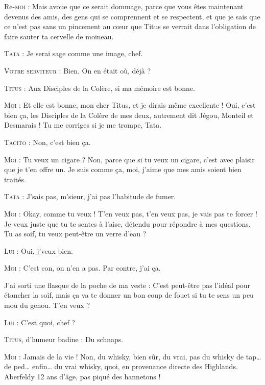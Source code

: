 \begin{dialogue}

Re-\textsc{moi} : Mais avoue que ce serait dommage, parce que vous êtes maintenant devenus des amis, des gens qui se comprennent et se respectent, et que je sais que ce n’est pas sans un pincement au cœur que Titus se verrait dans l’obligation de faire sauter ta cervelle de moineau.

\textsc{Tata} : Je serai sage comme une image, chef.

\textsc{Votre serviteur} : Bien. On en était où, déjà ?

\textsc{Titus} : Aux Disciples de la Colère, si ma mémoire est bonne.

\textsc{Moi} : Et elle est bonne, mon cher Titus, et je dirais même excellente ! Oui, c’est bien ça, les Disciples de la Colère de mes deux, autrement dit Jégou, Monteil et Desmarais ! Tu me corriges si je me trompe, Tata.

\textsc{Tacito} : Non, c’est bien ça.

\textsc{Moi} : Tu veux un cigare ? Non, parce que si tu veux un cigare, c’est avec plaisir que je t’en offre un. Je suis comme ça, moi, j’aime que mes amis soient bien traités.

\textsc{Tata} : J’sais pas, m’sieur, j’ai pas l’habitude de fumer.

\textsc{Moi} : Okay, comme tu veux ! T’en veux pas, t’en veux pas, je vais pas te forcer ! Je veux juste que tu te sentes à l’aise, détendu pour répondre à mes questions. Tu as soif, tu veux peut-être un verre d’eau ?

\textsc{Lui} : Oui, j’veux bien.

\textsc{Moi} : C’est con, on n’en a pas. Par contre, j’ai ça.

J’ai sorti une flasque de la poche de ma veste : C’est peut-être pas l’idéal pour étancher la soif, mais ça va te donner un bon coup de fouet si tu te sens un peu mou du genou. T’en veux ?

\textsc{Lui} : C’est quoi, chef ?

%
%
%
\textsc{Titus}, d’humeur badine : Du schnaps.

\textsc{Moi} : Jamais de la vie ! Non, du whisky, bien sûr, du vrai, pas du whisky de tap… de ped… enfin… du vrai whisky, quoi, en provenance directe des Highlands. Aberfeldy 12 ans d’âge, pas piqué des hannetons !


\end{dialogue}
